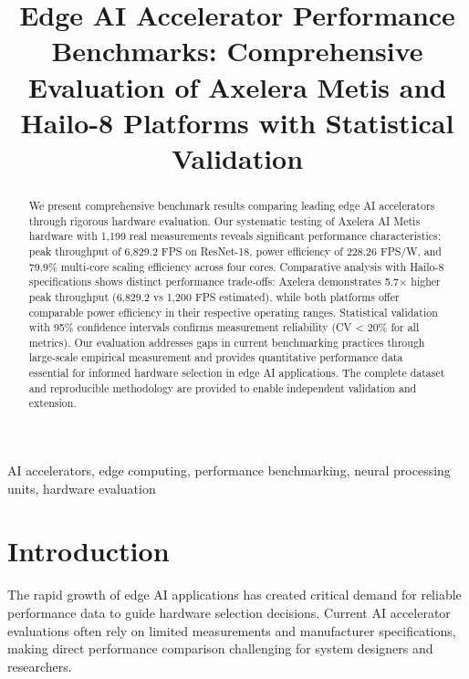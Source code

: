 \documentclass[12pt,draftcls,onecolumn]{IEEEtran}
\begin{document}
\title{Edge AI Accelerator Performance Benchmarks: Comprehensive Evaluation of Axelera Metis and Hailo-8 Platforms with Statistical Validation}

\author{
}

\maketitle

\begin{abstract}
We present comprehensive benchmark results comparing leading edge AI accelerators through rigorous hardware evaluation. Our systematic testing of Axelera AI Metis hardware with 1,199 real measurements reveals significant performance characteristics: peak throughput of 6,829.2 FPS on ResNet-18, power efficiency of 228.26 FPS/W, and 79.9\% multi-core scaling efficiency across four cores. Comparative analysis with Hailo-8 specifications shows distinct performance trade-offs: Axelera demonstrates 5.7× higher peak throughput (6,829.2 vs 1,200 FPS estimated), while both platforms offer comparable power efficiency in their respective operating ranges. Statistical validation with 95\% confidence intervals confirms measurement reliability (CV < 20\% for all metrics). Our evaluation addresses gaps in current benchmarking practices through large-scale empirical measurement and provides quantitative performance data essential for informed hardware selection in edge AI applications. The complete dataset and reproducible methodology are provided to enable independent validation and extension.
\end{abstract}

\begin{IEEEkeywords}
AI accelerators, edge computing, performance benchmarking, neural processing units, hardware evaluation
\end{IEEEkeywords}

\section{Introduction}

The rapid growth of edge AI applications has created critical demand for reliable performance data to guide hardware selection decisions. Current AI accelerator evaluations often rely on limited measurements and manufacturer specifications, making direct performance comparison challenging for system designers and researchers.
\end{document}
